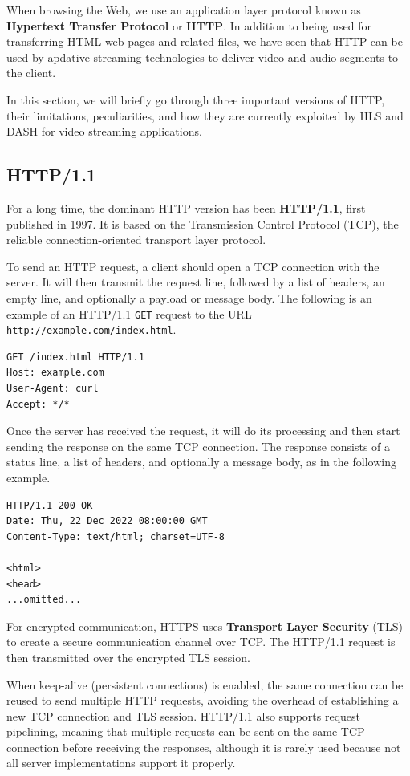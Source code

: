 When browsing the Web, we use an application layer protocol known as \textbf{Hypertext Transfer Protocol} or \textbf{HTTP}. In addition to being used for transferring HTML web pages and related files, we have seen that HTTP can be used by apdative streaming technologies to deliver video and audio segments to the client.

In this section, we will briefly go through three important versions of HTTP, their limitations, peculiarities, and how they are currently exploited by HLS and DASH for video streaming applications.

\subsection{HTTP/1.1}
\label{sec:bg/http1}

For a long time, the dominant HTTP version has been \textbf{HTTP/1.1}, first published in 1997.\cite{http1.1} It is based on the Transmission Control Protocol (TCP), the reliable connection-oriented transport layer protocol.

To send an HTTP request, a client should open a TCP connection with the server. It will then transmit the request line, followed by a list of headers, an empty line, and optionally a payload or message body. The following is an example of an HTTP/1.1 \texttt{GET} request to the URL \texttt{http://example.com/index.html}.

\begin{verbatim}
GET /index.html HTTP/1.1
Host: example.com
User-Agent: curl
Accept: */*
\end{verbatim}

Once the server has received the request, it will do its processing and then start sending the response on the same TCP connection. The response consists of a status line, a list of headers, and optionally a message body, as in the following example.

\begin{verbatim}
HTTP/1.1 200 OK
Date: Thu, 22 Dec 2022 08:00:00 GMT
Content-Type: text/html; charset=UTF-8

<html>
<head>
...omitted...
\end{verbatim}

For encrypted communication, HTTPS uses \textbf{Transport Layer Security} (TLS) to create a secure communication channel over TCP. The HTTP/1.1 request is then transmitted over the encrypted TLS session.

When keep-alive (persistent connections) is enabled, the same connection can be reused to send multiple HTTP requests, avoiding the overhead of establishing a new TCP connection and TLS session. HTTP/1.1 also supports request pipelining, meaning that multiple requests can be sent on the same TCP connection before receiving the responses, although it is rarely used because not all server implementations support it properly.

